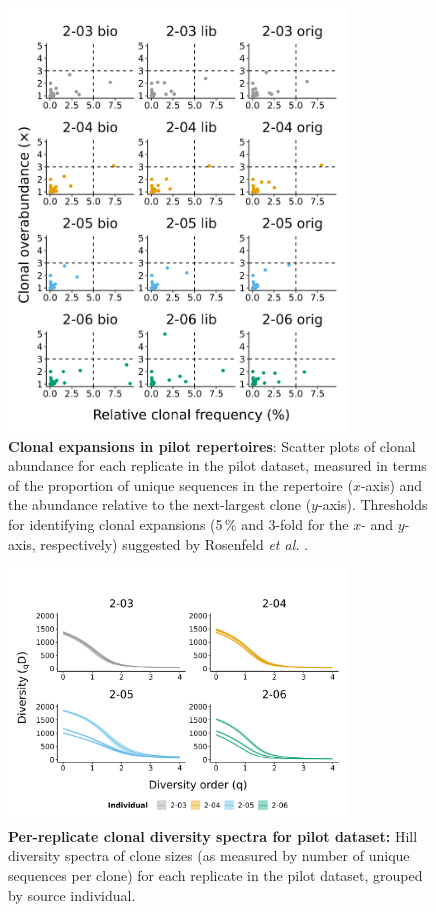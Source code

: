 \begin{figure}
\centering
\includegraphics[width=0.8\textwidth]{_Figures/png/pilot-clones-expansions-rep}
\caption[Clonal expansions in \Nfu pilot repertoires]{\textbf{Clonal expansions in \Nfu pilot repertoires}: Scatter plots of clonal abundance for each replicate in the pilot \igseq dataset, measured in terms of the proportion of unique sequences in the repertoire ($x$-axis) and the abundance relative to the next-largest clone ($y$-axis). Thresholds for identifying clonal expansions (5\,\% and 3-fold for the $x$- and $y$-axis, respectively) suggested by Rosenfeld \textit{et al.} \parencite{rosenfeld2018clonesize}.}
\label{fig:igseq-pilot-clones-expansions-rep}
\end{figure}

\begin{figure}
\centering
\includegraphics[width = 0.8\textwidth]{_Figures/png/pilot-clone-diversity-solo-spectra}
\caption[Per-replicate clonal diversity spectra for pilot dataset]{\textbf{Per-replicate clonal diversity spectra for pilot dataset:} Hill diversity spectra of clone sizes (as measured by number of unique sequences per clone) for each replicate in the \igseq pilot dataset, grouped by source individual.}
\label{fig:igseq-pilot-clone-diversity-solo-spectra}
\end{figure}

